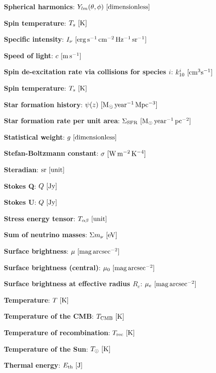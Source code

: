 \documentclass[a4paper,11pt]{article}
\begin{document}
{\noindent}\textbf{Spherical harmonics}: $Y_{lm}(\theta,\phi) ~ [{\rm dimensionless}]$

{\noindent}\textbf{Spin temperature}: $T_s ~ [{\rm K}]$

{\noindent}\textbf{Specific intensity}: $I_\nu ~ [{\rm erg\,s^{-1}\,cm^{-2}\,Hz^{-1}\,sr^{-1}}]$

{\noindent}\textbf{Speed of light}: $c ~ [{\rm m\,s^{-1}}]$

{\noindent}\textbf{Spin de-excitation rate via collisions for species $i$}: $k_{10}^i ~ [{\rm cm^3s^{-1}}]$

{\noindent}\textbf{Spin temperature}: $T_s ~ [{\rm K}]$

{\noindent}\textbf{Star formation history}: $\psi(z) ~ [{\rm M_\odot\,year^{-1}\,Mpc^{-3}}]$

{\noindent}\textbf{Star formation rate per unit area}: $\Sigma_\mathrm{SFR} ~ [{\rm M_\odot\,year^{-1}\,pc^{-2}}]$

{\noindent}\textbf{Statistical weight}: $g ~ [{\rm dimensionless}]$

{\noindent}\textbf{Stefan-Boltzmann constant}: $\sigma ~ [{\rm W\,m^{-2}\,K^{-4}}]$

{\noindent}\textbf{Steradian}: ${\rm sr} ~ [{\rm unit}]$

{\noindent}\textbf{Stokes Q}: $Q ~ [{\rm Jy}]$

{\noindent}\textbf{Stokes U}: $Q ~ [{\rm Jy}]$

{\noindent}\textbf{Stress energy tensor}: $T_{\alpha\beta} ~ [{\rm unit}]$

{\noindent}\textbf{Sum of neutrino masses}: $\Sigma m_\nu ~ [{\rm eV}]$

{\noindent}\textbf{Surface brightness}: $\mu ~ [{\rm mag\,arcsec^{-2}}]$

{\noindent}\textbf{Surface brightness (central)}: $\mu_0 ~ [{\rm mag\,arcsec^{-2}}]$

{\noindent}\textbf{Surface brightness at effective radius $R_e$}: $\mu_e ~ [{\rm mag\,arcsec^{-2}}]$

{\noindent}\textbf{Temperature}: $T ~ [{\rm K}]$

{\noindent}\textbf{Temperature of the CMB}: $T_{\rm CMB} ~ [{\rm K}]$

{\noindent}\textbf{Temperature of recombination}: $T_{\rm rec} ~ [{\rm K}]$

{\noindent}\textbf{Temperature of the Sun}: $T_\odot ~ [{\rm K}]$

{\noindent}\textbf{Thermal energy}: $E_\mathrm{th} ~ [{\rm J}]$
\end{document}
